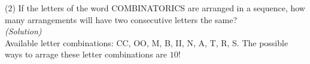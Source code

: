 (2) If the letters of the word COMBINATORICS are arranged 
    in a sequence, how many arrangements will have two consecutive letters the same?\\

    \textit{(Solution)}\\

    Available letter combinations: 
    CC, OO, M, B, II, N, A, T, R, S. The possible ways 
    to arrage these letter combinations are $10!$
    